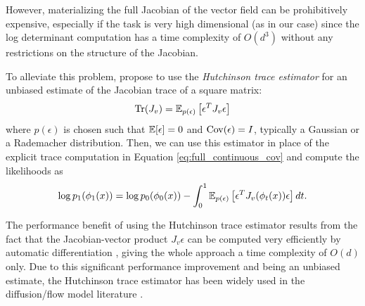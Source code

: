 However, materializing the full Jacobian of the vector field can be prohibitively expensive, especially if the task is very high dimensional (as in our case) since the log determinant computation has a time complexity of $O(d^3)$ \citep{grathwohlFFJORDFreeformContinuous2018} without any restrictions on the structure of the Jacobian. 

To alleviate this problem, \citep{grathwohlFFJORDFreeformContinuous2018} propose to use the \textit{Hutchinson trace estimator} \citep{hutchinsonStochasticEstimatorTrace1990} for an unbiased estimate of the Jacobian trace of a square matrix: 
\begin{equation} \label{eq:hutchinson}
    \operatorname{Tr}(J_v) = \mathbb{E}_{p(\epsilon)} \left[ \epsilon^T J_v \epsilon \right]
\end{equation}
where $p(\epsilon)$ is chosen such that $\mathbb{E}[\epsilon] = 0$ and $\operatorname{Cov}(\epsilon) = I$, typically a Gaussian or a Rademacher distribution. Then, we can use this estimator in place of the explicit trace computation in Equation \ref{eq:full_continuous_cov} and compute the likelihoods as
\begin{equation}
    \log p_1(\phi_1(x)) = \log p_0(\phi_0(x)) - \int_0^1 \mathbb{E}_{p(\epsilon)} \left[ \epsilon^T J_v(\phi_t(x)) \epsilon \right] dt.
\end{equation}

The performance benefit of using the Hutchinson trace estimator results from the fact that the Jacobian-vector product $J_v \epsilon$ can be computed very efficiently by automatic differentiation \citep{baydinAutomaticDifferentiationMachine2018}, giving the whole approach a time complexity of $O(d)$ only. Due to this significant performance improvement and being an unbiased estimate, the Hutchinson trace estimator has been widely used in the diffusion/flow model literature \citep{lipmanFlowMatchingGenerative2023,songScoreBasedGenerativeModeling2021a}.


